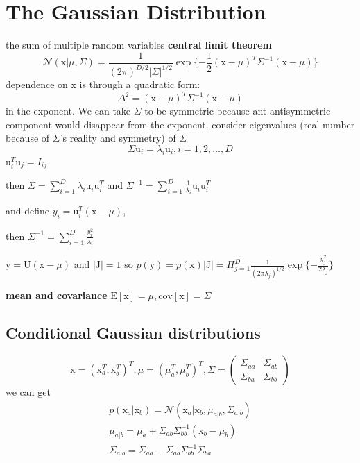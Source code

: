 \documentclass[a4paper]{book}
\begin{document}
\section{The Gaussian Distribution}
the sum of multiple random variables
\textbf{central limit theorem}
\begin{equation}\label{1.2.8}
  \mathcal N(\mathrm x|\mu, \Sigma) = \frac1{(2\pi)^{D/2}|\Sigma|^{1/2}}\exp\{-\frac12(\mathrm x-\mu)^T\Sigma^{-1}(\mathrm x-\mu)\}
\end{equation}
dependence on $\mathrm x$ is through a quadratic form:
$$\Delta^2 = (\mathrm x-\mu)^T\Sigma^{-1}(\mathrm x-\mu)$$ in the exponent.\newline
We can take $\Sigma$ to be symmetric because ant antisymmetric component would disappear from the exponent.
consider eigenvalues (real number because of $\Sigma$'s reality and symmetry) of $\Sigma$
\begin{equation}\label{1.2.9}
  \Sigma \mathrm u_i= \lambda_i\mathrm u_i, i = 1,2,\dots,D
\end{equation}
$\mathrm u_i^T\mathrm u_j = I_{ij}$

then $\Sigma = \sum_{i=1}^D\lambda_i\mathrm u_i\mathrm u_i^T$ and $\Sigma^{-1} = \sum_{i=1}^D\frac1{\lambda_i}\mathrm u_i\mathrm u_i^T$

and define $y_i=\mathrm u_i^T(\mathrm x-\mu)$,

then $\Sigma^{-1} = \sum_{i=1}^D\frac{y_i^2}{\lambda_i}$

$\mathrm y=\mathrm U(\mathrm x-\mu)$ and $|\mathrm J| = 1$ so $p(\mathrm y) = p(\mathrm x)|\mathrm J| = \Pi_{j=1}^D\frac{1}{(2\pi\lambda_j)^{1/2}}\exp\{-\frac{y_j^2}{2\lambda_j}\}$

\textbf{mean and covariance}
$\mathrm E[\mathrm x] = \mu, \mathrm {cov}[\mathrm x] = \Sigma$

\subsection{Conditional Gaussian distributions}
\begin{equation}\label{1.2.10}
  \mathrm x =(\mathrm x_a^T,\mathrm x_b^T)^T, \mu=(\mu_a^T,\mu_b^T)^T, \Sigma=\left(\begin{matrix}\Sigma_{aa} & \Sigma_{ab}\\\Sigma_{ba} & \Sigma_{bb}\end{matrix} \right)
\end{equation}
we can get
\begin{gather}\label{1.2.11}
  p( \mathrm x_a|\mathrm x_b) = \mathcal N(\mathrm x_a|\mathrm x_b,\mu_{a|b},\Sigma_{a|b}) \\
  \mu_{a|b} = \mu_a+\Sigma_{ab}\Sigma_{bb}^{-1}(\mathrm x_b-\mu_b) \\
  \Sigma_{a|b} = \Sigma_{aa}-\Sigma_{ab}\Sigma_{bb}^{-1}\Sigma_{ba}
\end{gather}
\end{document}
